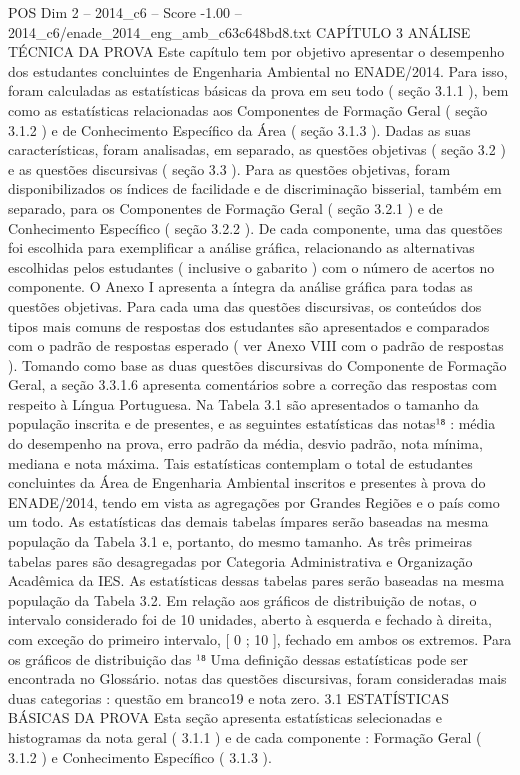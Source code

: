 \begin{textsample}{POS Dim 2 – 2014\_c6 – Score -1.00 – 2014\_c6/enade\_2014\_eng\_amb\_c63c648bd8.txt}  \label{ex:f2_pos_234}
CAPÍTULO 3 ANÁLISE TÉCNICA DA PROVA Este capítulo tem por objetivo apresentar o desempenho dos estudantes concluintes de Engenharia Ambiental no ENADE/2014.
Para isso, foram calculadas as estatísticas básicas da prova em seu todo ( seção 3.1.1 ), bem como as estatísticas relacionadas aos Componentes de Formação Geral ( seção 3.1.2 ) e de Conhecimento Específico da Área ( seção 3.1.3 ).
Dadas as suas características, foram analisadas, em separado, as questões objetivas ( seção 3.2 ) e as questões discursivas ( seção 3.3 ).
Para as questões objetivas, foram disponibilizados os índices de facilidade e de discriminação bisserial, também em separado, para os Componentes de Formação Geral ( seção 3.2.1 ) e de Conhecimento Específico ( seção 3.2.2 ).
De cada componente, uma das questões foi escolhida para exemplificar a análise gráfica, relacionando as alternativas escolhidas pelos estudantes ( inclusive o gabarito ) com o número de acertos no componente.
O Anexo I apresenta a íntegra da análise gráfica para todas as questões objetivas.
Para cada uma das questões discursivas, os conteúdos dos tipos mais comuns de respostas dos estudantes são apresentados e comparados com o padrão de respostas esperado ( ver Anexo VIII com o padrão de respostas ).
Tomando como base as duas questões discursivas do Componente de Formação Geral, a seção 3.3.1.6 apresenta comentários sobre a correção das respostas com respeito à Língua Portuguesa.
Na Tabela 3.1 são apresentados o tamanho da população inscrita e de presentes, e as seguintes estatísticas das notas¹⁸ : média do desempenho na prova, erro padrão da média, desvio padrão, nota mínima, mediana e nota máxima.
Tais estatísticas contemplam o total de estudantes concluintes da Área de Engenharia Ambiental inscritos e presentes à prova do ENADE/2014, tendo em vista as agregações por Grandes Regiões e o país como um todo.
As estatísticas das demais tabelas ímpares serão baseadas na mesma população da Tabela 3.1 e, portanto, do mesmo tamanho.
As três primeiras tabelas pares são desagregadas por Categoria Administrativa e Organização Acadêmica da IES.
As estatísticas dessas tabelas pares serão baseadas na mesma população da Tabela 3.2.
Em relação aos gráficos de distribuição de notas, o intervalo considerado foi de 10 unidades, aberto à esquerda e fechado à direita, com exceção do primeiro intervalo, [ 0 ; 10 ], fechado em ambos os extremos.
Para os gráficos de distribuição das ¹⁸ Uma definição dessas estatísticas pode ser encontrada no Glossário. notas das questões discursivas, foram consideradas mais duas categorias : questão em branco19 e nota zero. 3.1 ESTATÍSTICAS BÁSICAS DA PROVA Esta seção apresenta estatísticas selecionadas e histogramas da nota geral ( 3.1.1 ) e de cada componente : Formação Geral ( 3.1.2 ) e Conhecimento Específico ( 3.1.3 ).

\end{textsample}
